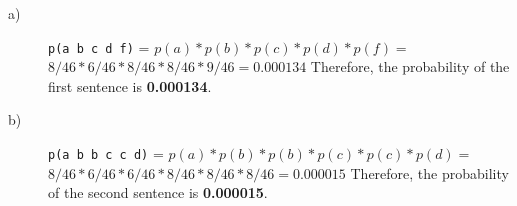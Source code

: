 \begin{description}
    \item[a)] \verb/p(a b c d f)/ = \n
        $p(a)*p(b)*p(c)*p(d)*p(f) =$ \n
        $8/46*6/46*8/46*8/46*9/46 = 0.000134$\n\n
        Therefore, the probability of the first sentence is \textbf{0.000134}.
    \item[b)] \verb/p(a b b c c d)/ = \n
        $p(a)*p(b)*p(b)*p(c)*p(c)*p(d) =$ \n
        $8/46*6/46*6/46*8/46*8/46*8/46 = 0.000015$\n\n
        Therefore, the probability of the second sentence is \textbf{0.000015}.
\end{description}